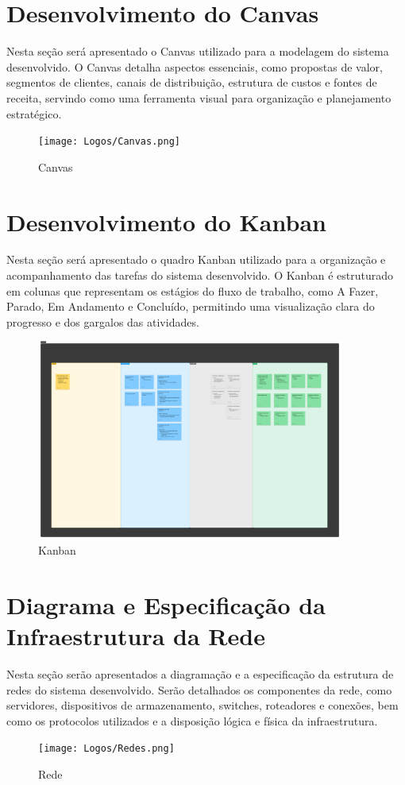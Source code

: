 \documentclass[
  a4paper,%
  12pt,%
  english,%
  brazilian,%
]{article}
\begin{document}
\newpage
\section*{Desenvolvimento do Canvas}
Nesta seção será apresentado o Canvas utilizado para a modelagem do sistema desenvolvido. O Canvas detalha aspectos essenciais, como propostas de valor, segmentos de clientes, canais de distribuição, estrutura de custos e fontes de receita, servindo como uma ferramenta visual para organização e planejamento estratégico.
     \begin{figure}[h]
\centering
\caption{Canvas}%
\label{fig:canvas}
\texttt{[image: Logos/Canvas.png]}
\end{figure}

\newpage
\section*{Desenvolvimento do Kanban}
Nesta seção será apresentado o quadro Kanban utilizado para a organização e acompanhamento das tarefas do sistema desenvolvido. O Kanban é estruturado em colunas que representam os estágios do fluxo de trabalho, como A Fazer, Parado, Em Andamento e Concluído, permitindo uma visualização clara do progresso e dos gargalos das atividades.
     \begin{figure}[h]
\centering
\caption{Kanban}%
\label{fig:kanban}
\includegraphics[width=0.9\textwidth]{Logos/Kanban.png}
\end{figure}

\newpage
\section*{Diagrama e Especificação da Infraestrutura da Rede}
Nesta seção serão apresentados a diagramação e a especificação da estrutura de redes do sistema desenvolvido. Serão detalhados os componentes da rede, como servidores, dispositivos de armazenamento, switches, roteadores e conexões, bem como os protocolos utilizados e a disposição lógica e física da infraestrutura. 
     \begin{figure}[h]
\centering
\caption{Rede}%
\label{fig:rede}
\texttt{[image: Logos/Redes.png]}
\end{figure}
\end{document}
